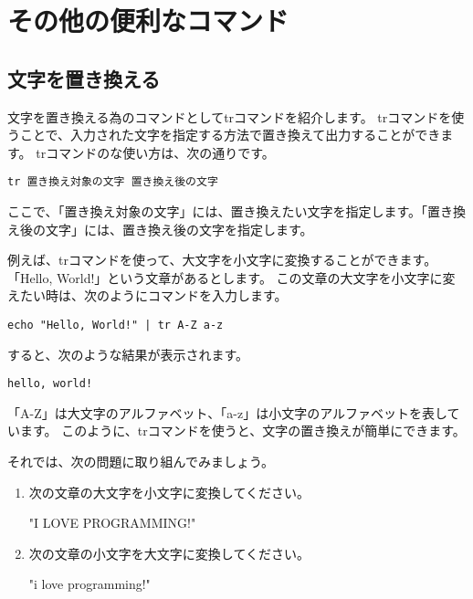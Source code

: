 \section{その他の便利なコマンド}

\subsection{文字を置き換える}


文字を置き換える為のコマンドとしてtrコマンドを紹介します。
trコマンドを使うことで、入力された文字を指定する方法で置き換えて出力することができます。
trコマンドのな使い方は、次の通りです。

\begin{lstlisting}[caption=trコマンドの基本的な使い方, label=tr_basic_usage]
tr 置き換え対象の文字 置き換え後の文字
\end{lstlisting}

ここで、「置き換え対象の文字」には、置き換えたい文字を指定します。「置き換え後の文字」には、置き換え後の文字を指定します。


例えば、trコマンドを使って、大文字を小文字に変換することができます。
「Hello, World!」という文章があるとします。
この文章の大文字を小文字に変えたい時は、次のようにコマンドを入力します。

\begin{lstlisting}[caption=trコマンドを使った大文字から小文字への変換, label=tr_cap_to_low]
echo "Hello, World!" | tr A-Z a-z
\end{lstlisting}

すると、次のような結果が表示されます。
\begin{lstlisting}[caption=大文字を小文字に変換した結果, label=result_tr_cap_to_low]
hello, world!
\end{lstlisting}

「A-Z」は大文字のアルファベット、「a-z」は小文字のアルファベットを表しています。
このように、trコマンドを使うと、文字の置き換えが簡単にできます。

それでは、次の問題に取り組んでみましょう。
\begin{enumerate}
    \item 次の文章の大文字を小文字に変換してください。 

    "I LOVE PROGRAMMING!"
    \item 次の文章の小文字を大文字に変換してください。 

    "i love programming!"
\end{enumerate}

